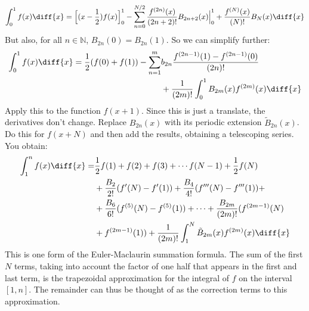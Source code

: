 \documentclass[crop=false,class=book,oneside]{standalone}
\begin{document}
        \begin{equation}
            \int_{0}^{1}f(x)\diff{x}=
            \Big[(x-\frac{1}{2})f(x)\Big]_{0}^{1}-
            \sum_{n=0}^{N/2}\frac{f^{(2n)}(x)}{(2n+2)!}B_{2n+2}(x)
                \Big|_{0}^{1}+\frac{f^{(N)}(x)}{(N)!}B_{N}(x)\diff{x}
        \end{equation}
        But also, for all $n\in\mathbb{N}$, $B_{2n}(0)=B_{2n}(1)$. So we can
        simplify further:
        \begin{equation}
            \begin{split}
                \int_{0}^{1}f(x)\diff{x}=
                    \frac{1}{2}(f(0)+f(1))-\sum_{n=1}^{m}&b_{2n}
                        \frac{f^{(2n-1)}(1)-f^{(2n-1)}(0)}{(2n)!}\\
                    &+\frac{1}{(2m)!}\int_{0}^{1}
                        B_{2m}(x)f^{(2m)}(x)\diff{x}
            \end{split}
        \end{equation}
        Apply this to the function $f(x+1)$. Since this is just a translate,
        the derivatives don't change. Replace $B_{2n}(x)$ with its
        periodic extension $\tilde{B}_{2n}(x)$. Do this for $f(x+N)$ and
        then add the results, obtaining a telescoping series. You obtain:
        \begin{equation}
            \begin{split}
                \int_{1}^{n}f(x)\diff{x}
                    =&\frac{1}{2}f(1)+f(2)+f(3)+
                        \cdots{f}(N-1)+\frac{1}{2}f(N)\\
                        &+\frac{B_{2}}{2!}(f'(N)-f'(1))+
                        \frac{B_{4}}{4!}(f'''(N)-f'''(1))+\\
                        &+\frac{B_{6}}{6!}(f^{(5)}(N)-f^{(5)}(1))+\cdots+
                        \frac{B_{2m}}{(2m)!}(f^{(2m-1)}(N)\\
                        &+f^{(2m-1)}(1))+\frac{1}{(2m)!}\int_{1}^{N}
                        \tilde{B}_{2m}(x)f^{(2m)}(x)\diff{x}
            \end{split}
        \end{equation}
        This is one form of the Euler-Maclaurin summation formula. The sum
        of the first $N$ terms, taking into account the factor of one half
        that appears in the first and last term, is the trapezoidal
        approximation for the integral of $f$ on the interval $[1,n]$. The
        remainder can thus be thought of as the correction terms to this
        approximation.
\end{document}

